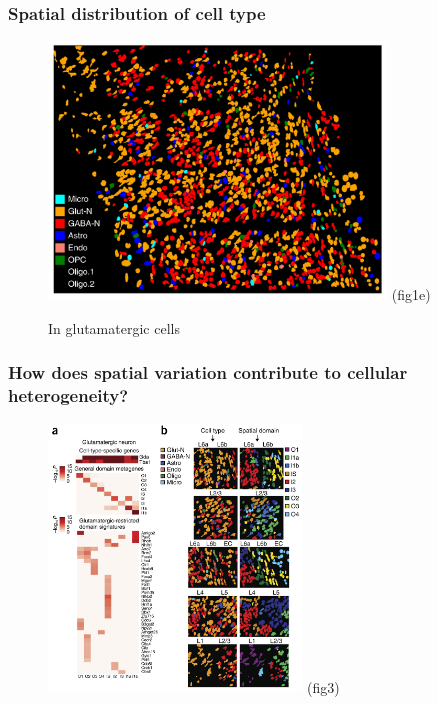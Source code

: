 \documentclass{beamer}
\begin{document}
  \begin{frame}
  \frametitle{Spatial distribution of cell type}
  \begin{figure}
    \centering
    \includegraphics[width=0.8\textwidth]{cell_type} (fig1e)
    \caption{In glutamatergic cells}
  \end{figure}
  \end{frame}

  \begin{frame}
  \frametitle{How does spatial variation contribute to cellular heterogeneity?}
  \begin{figure}
    \centering
    \includegraphics[width=0.6\textwidth]{heter} (fig3)
  \end{figure}
  \end{frame}
\end{document}
